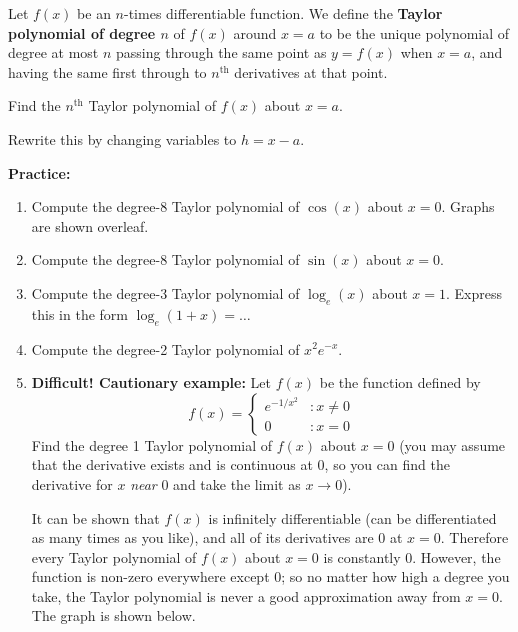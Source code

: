 \documentclass{article}
\begin{document}
\vspace{1mm}

Let $f(x)$ be an $n$-times differentiable function. We define the \textbf{Taylor polynomial of degree $n$} of $f(x)$ around $x=a$ to be the unique polynomial of degree at most $n$ passing through the same point as $y=f(x)$ when $x=a$, and having the same first through to $n^\mathrm{th}$ derivatives at that point.\bigskip


Find the $n^\mathrm{th}$ Taylor polynomial of $f(x)$ about $x=a$.


\vfill



Rewrite this by changing variables to $h=x-a$.

\vfill






\clearpage

\textbf{Practice:}


\begin{enumerate}
	\item Compute the degree-8 Taylor polynomial of $\cos(x)$ about $x=0$. Graphs are shown overleaf.
	\item Compute the degree-8 Taylor polynomial of $\sin(x)$ about $x=0$.
	\item Compute the degree-3 Taylor polynomial of $\log_e(x)$ about $x=1$. Express this in the form $\log_e(1+x)=\hdots$
	\item Compute the degree-2 Taylor polynomial of $x^2e^{-x}$.
	\item \textbf{Difficult! Cautionary example:} Let $f(x)$ be the function defined by
		\[f(x)=\begin{cases}
				e^{-1/x^2} & :x\neq 0\\
				0 & :x=0
			\end{cases}\]
		Find the degree 1 Taylor polynomial of $f(x)$ about $x=0$ (you may assume that the derivative exists and is continuous at 0, so you can find the derivative for $x$ \textit{near} 0 and take the limit as $x\to 0$).\bigskip
		
		It can be shown that $f(x)$ is infinitely differentiable (can be differentiated as many times as you like), and all of its derivatives are 0 at $x=0$. Therefore every Taylor polynomial of $f(x)$ about $x=0$ is constantly 0. However, the function is non-zero everywhere except 0; so no matter how high a degree you take, the Taylor polynomial is never a good approximation away from $x=0$. The graph is shown below.
\end{enumerate}
\end{document}
